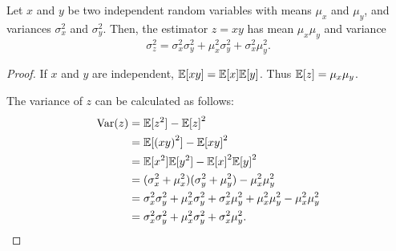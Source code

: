 
\begin{lemma}
\label{lem:variance-product}
  Let $x$ and $y$ be two independent random variables with means $\mu_x$ and $\mu_y$, and variances $\sigma^2_x$ and $\sigma^2_y$.
  Then, the estimator $z = x y$ has mean $\mu_x \mu_y$ and variance
  $$\sigma^2_z = \sigma_x^2 \sigma_y^2 + \mu_x^2 \sigma_y^2 + \sigma_x^2 \mu_y^2.$$
\end{lemma}
\begin{proof}
  If $x$ and $y$ are independent, $\mathbb{E}[xy] = \mathbb{E}[x]\mathbb{E}[y]$. Thus $\mathbb{E}[z] = \mu_x \mu_y$.

  The variance of $z$ can be calculated as follows:
  \begin{align*}
    \text{Var}(z) &= \mathbb{E}[z^2] - {\mathbb{E}[z]}^2 \\
    &= \mathbb{E}[{(xy)}^2] - {\mathbb{E}[xy]}^2 \\
            &= \mathbb{E}[x^2] \mathbb{E}[y^2] - {\mathbb{E}[x]}^2 {\mathbb{E}[y]}^2 \\
            &= (\sigma^2_x + \mu_x^2)(\sigma^2_y + \mu_y^2) - \mu_x^2 \mu_y^2 \\
            &= \sigma_x^2 \sigma_y^2 + \mu_x^2 \sigma_y^2 + \sigma_x^2 \mu_y^2 + \mu_x^2 \mu_y^2 - \mu_x^2 \mu_y^2 \\
            &= \sigma_x^2 \sigma_y^2 + \mu_x^2 \sigma_y^2 + \sigma_x^2 \mu_y^2.
  \end{align*}
\end{proof}

